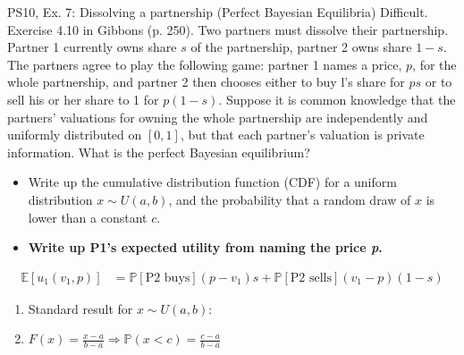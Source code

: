\begin{frame}{PS10, Ex. 7: Dissolving a partnership (Perfect Bayesian Equilibria)}
    Difficult. Exercise 4.10 in Gibbons (p. 250). Two partners must dissolve their partnership. Partner 1 currently owns share $s$ of the partnership, partner 2 owns share $1-s$. The partners agree to play the following game: partner 1 names a price, $p$, for the whole partnership, and partner 2 then chooses either to buy l's share for $ps$ or to sell his or her share to 1 for $p(1-s)$. Suppose it is common knowledge that the partners' valuations for owning the whole partnership are independently and uniformly distributed on $[0,1]$, but that each partner's valuation is private information. What is the perfect Bayesian equilibrium?\vspace{-8pt}
    \begin{multicols}{2}
      \begin{itemize}
        \item[Step 1:] Write up the cumulative distribution function (CDF) for a uniform distribution $x\sim U(a, b)$, and the probability that a random draw of $x$ is lower than a constant $c$.
        \item[Step 2:] \textbf{Write up P1's expected utility from naming the price \textit{p}.}
      \end{itemize} \vspace{-8pt}
      \begin{align*}
          \mathbb{E}[u_1(v_1,p)]
            &=\mathbb{P}[\text{P2 buys}](p-v_1)s+\mathbb{P}[\text{P2 sells}](v_1-p)(1-s)
      \end{align*}
      \vfill\null\columnbreak
      \begin{enumerate}
        \item Standard result for $x\sim U(a, b):$
        \item[CDF:] $F(x)=\frac{x-a}{b-a}\Rightarrow\mathbb{P}(x<c)=\frac{c-a}{b-a}$
      \end{enumerate}
      \vfill\null
    \end{multicols}
\end{frame}

